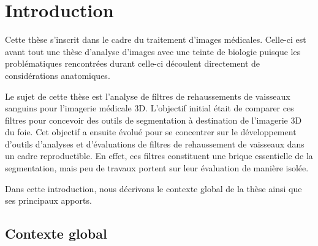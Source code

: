 %

\chapter*{Introduction}
\label{sec:introduction}


Cette thèse s'inscrit dans le cadre du traitement d'images médicales. Celle-ci est avant tout une thèse d'analyse d'images avec une teinte de biologie puisque les problématiques rencontrées durant celle-ci découlent directement de considérations anatomiques.

Le sujet de cette thèse est l'analyse de filtres de rehaussements de vaisseaux sanguins pour l'imagerie médicale 3D. L'objectif initial était de comparer ces filtres pour concevoir des outils de segmentation à destination de l'imagerie 3D du foie. Cet objectif a ensuite évolué pour se concentrer sur le développement d'outils d'analyses et d'évaluations de filtres de rehaussement de vaisseaux dans un cadre reproductible. En effet, ces filtres constituent une brique essentielle de la segmentation, mais peu de travaux portent sur leur évaluation de manière isolée.

Dans cette introduction, nous décrivons le contexte global de la thèse ainsi que ses principaux apports.

\section{Contexte global}


